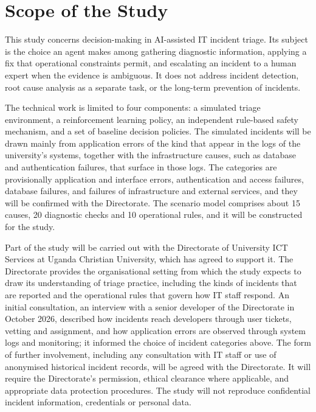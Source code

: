 \section{Scope of the Study}

This study concerns decision-making in AI-assisted IT incident triage. Its subject is the choice an agent makes among gathering diagnostic information, applying a fix that operational constraints permit, and escalating an incident to a human expert when the evidence is ambiguous. It does not address incident detection, root cause analysis as a separate task, or the long-term prevention of incidents.

The technical work is limited to four components: a simulated triage environment, a reinforcement learning policy, an independent rule-based safety mechanism, and a set of baseline decision policies. The simulated incidents will be drawn mainly from application errors of the kind that appear in the logs of the university's systems, together with the infrastructure causes, such as database and authentication failures, that surface in those logs. The categories are provisionally application and interface errors, authentication and access failures, database failures, and failures of infrastructure and external services, and they will be confirmed with the Directorate. The scenario model comprises about 15 causes, 20 diagnostic checks and 10 operational rules, and it will be constructed for the study.

Part of the study will be carried out with the Directorate of University ICT Services at Uganda Christian University, which has agreed to support it. The Directorate provides the organisational setting from which the study expects to draw its understanding of triage practice, including the kinds of incidents that are reported and the operational rules that govern how IT staff respond. An initial consultation, an interview with a senior developer of the Directorate in October 2026, described how incidents reach developers through user tickets, vetting and assignment, and how application errors are observed through system logs and monitoring; it informed the choice of incident categories above. The form of further involvement, including any consultation with IT staff or use of anonymised historical incident records, will be agreed with the Directorate. It will require the Directorate's permission, ethical clearance where applicable, and appropriate data protection procedures. The study will not reproduce confidential incident information, credentials or personal data.

